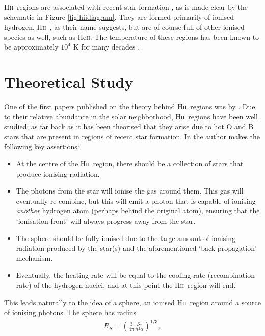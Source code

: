 \documentclass[a4paper]{article}
\newcommand{\hii}{H\textsc{ii}~}
\begin{document}
\hii regions are associated with recent star formation
\citep{anderson_molecular_2009}, as is made clear by the schematic in Figure
\ref{fig:hiidiagram}.  They are formed primarily of ionised hydrogen, \hii, as
their name suggests, but are of course full of other ionised species as well,
such as He\textsc{ii}.  The temperature of these regions has been known to be
approximately $10^4$ K for many decades \citep{peimbert_temperature_1967}.

\section{Theoretical Study}

One of the first papers published on the theory behind \hii regions was by
\citet{stromgren_physical_1939}. Due to their relative abundance in the solar
neighborhood, \hii regions have been well studied; as far back as 
\citep{struve_emission_1938} it has been theorised that they arise due to
hot O and B stars that are present in regions of recent star formation.
In \citet{stromgren_physical_1939} the author makes the following key
assertions:
\begin{itemize}
    \item At the centre of the \hii region, there should be a collection of
          stars that produce ionising radiation.
    \item The photons from the star will ionise the gas around them. This
          gas will eventually re-combine, but this will emit a photon that is
          capable of ionising \emph{another} hydrogen atom (perhaps
          behind the original atom), ensuring that the `ionisation front'
          will always progress away from the star.
    \item The sphere should be fully ionised due to the large amount of
          ionising radiation produced by the star(s) and the aforementioned
          `back-propagation' mechanism.
    \item Eventually, the heating rate will be equal to the cooling rate
          (recombination rate) of the hydrogen nuclei, and at this point 
          the \hii region will end.
\end{itemize}
This leads naturally to the idea of a \citet{stromgren_physical_1939} sphere,
an ionised \hii region around a source of ionising photons. The sphere has
radius
\begin{align}
    R_S = \left(
    \frac{3}{4\pi} \frac{S_*}{n^2 \alpha} \right)^{1/3},
    \label{eqn:rs}
\end{align}
\end{document}
